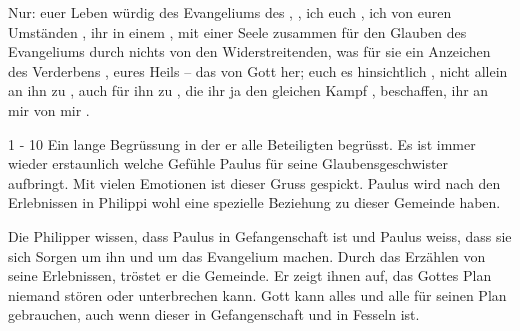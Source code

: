 Nur:  euer Leben  würdig des Evangeliums des , ,  ich   euch   , ich von euren Umständen ,  ihr  in einem , mit einer Seele zusammen  für den Glauben des Evangeliums  durch nichts  von den Widerstreitenden, was für sie ein Anzeichen des Verderbens ,  eures Heils --  das von Gott her;  euch  es hinsichtlich  , nicht allein an ihn zu ,  auch für ihn zu , die ihr ja den gleichen Kampf ,  beschaffen,  ihr  an mir   von mir .

\begin{otsblock}
    \begin{itshape}
        1 - 10 Ein lange Begrüssung in der er alle Beteiligten begrüsst. Es ist immer wieder erstaunlich welche Gefühle Paulus für seine Glaubensgeschwister aufbringt. Mit vielen Emotionen ist dieser Gruss gespickt. Paulus wird nach den Erlebnissen in Philippi wohl eine spezielle Beziehung zu dieser Gemeinde haben.

        Die Philipper wissen, dass Paulus in Gefangenschaft ist und Paulus weiss, dass sie sich Sorgen um ihn und um das Evangelium machen. Durch das Erzählen von seine Erlebnissen, tröstet er die Gemeinde. Er zeigt ihnen auf, das Gottes Plan niemand stören oder unterbrechen kann. Gott kann alles und alle für seinen Plan gebrauchen, auch wenn dieser in Gefangenschaft und in Fesseln ist.
    \end{itshape}
\end{otsblock}